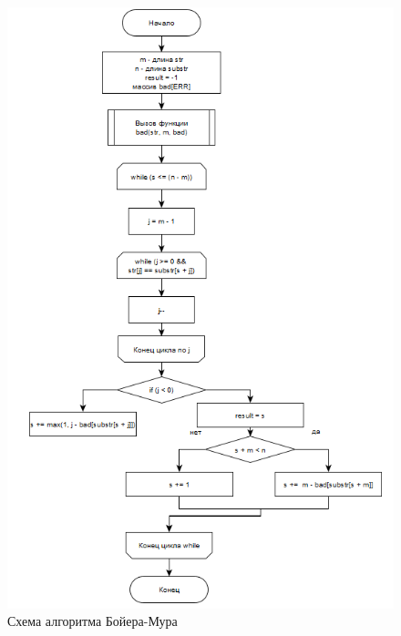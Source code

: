 \documentclass[12pt, a4paper]{report}
\begin{document}
	\begin{figure}[ht!]
		\centering
		\includegraphics[scale=1.2]{img/second.png}
		\caption{Схема алгоритма Бойера-Мура}
		\label{ris:second}
	\end{figure}\newpage
	
\end{document}
